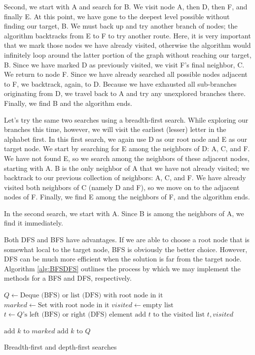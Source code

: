 Second, we start with A and search for B.
We visit node A, then D, then F, and finally E.
At this point, we have gone to the deepest level possible without finding our target, B.
We must back up and try another branch of nodes;
the algorithm backtracks from E to F to try another route.
Here, it is very important that we mark those nodes we have already visited,
otherwise the algorithm would infinitely loop around the latter portion of
the graph without reaching our target, B. Since we have marked D as previously visited, we visit F's final neighbor, C.
We return to node F. Since we have already
searched all possible nodes adjacent to F, we backtrack, again, to D. Because we have
exhausted all sub-branches originating from D, we travel back to A and try
any unexplored branches there. Finally, we find B and the algorithm ends.

Let's try the same two searches using a breadth-first search. While exploring our branches this time, however,
we will visit the earliest (lesser) letter in the alphabet first. In this first search, we again use D as our root node and
E as our target node.
We start by searching for E among the neighbors of D: A, C, and F.
We have not found E, so we search among the neighbors of these adjacent nodes, starting with A.
B is the only neighbor of A that we have not already visited; we backtrack to our previous collection of neighbors: A, C, and F.
We have already visited both neighbors of C (namely D and F), so we move on to the adjacent nodes of F. Finally, we find E among the neighbors of F, and the algorithm ends.

In the second search, we start with A.
Since B is among the neighbors of A, we find it immediately.

Both DFS and BFS have advantages.
If we are able to choose a root node that is somewhat local to the target node, BFS is obviously the better choice. However,
DFS can be much more efficient when the solution is far from the target node.
Algorithm \ref{alg:BFSDFS} outlines the process by which we may implement the methods for a BFS and DFS, respectively.

\begin{algorithm}
\begin{algorithmic}[1]
	\State $Q \gets \text{Deque (BFS) or list (DFS) with root node in it}$	
	\State $marked \gets \text{Set with root node in it}$	
	\State $visited \gets \text{empty list}$	
							
		\State $t \gets Q\text{'s left (BFS) or right (DFS) element}$	
		\State $\text{add }t \text{ to the visited list}$
									
			\State {} $t,visited$
		
		\Else										{}
					\State $\text{add } k \text{ to } marked$
					\State $\text{add } k \text{ to } Q$
				\EndIf
			\EndFor
		\EndIf
	\EndWhile
\EndProcedure
\end{algorithmic}
\caption{Breadth-first and depth-first searches}
\label{alg:BFSDFS}
\end{algorithm}

